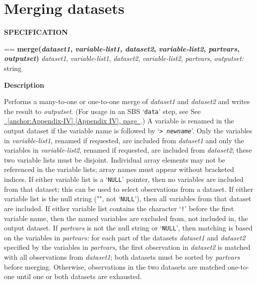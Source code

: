 \documentclass{book}
\makeatletter
\newcommand\Texinfocommandstyletextvar[1]{{\normalfont{}\textsl{#1}}}%
\newenvironment{Texinfopreformatted}{%
  \par\GNUTobeylines\obeyspaces\frenchspacing\parskip=\z@\parindent=\z@}{}
{\catcode`\^^M=13 \gdef\GNUTobeylines{\catcode`\^^M=13 \def^^M{\null\par}}}
\newenvironment{Texinfoindented}{\begin{list}{}{}\item\relax}{\end{list}}
\renewcommand{\_}{\Texinfounderscore\discretionary{}{}{}}
\makeatother
\begin{document}
\section{{Merging datasets}}
\label{anchor:Merging-datasets}%

\noindent{}\textbf{SPECIFICATION}
\begin{Texinfoindented}
\begin{Texinfopreformatted}%
\textbf{merge(\Texinfocommandstyletextvar{dataset1}, \Texinfocommandstyletextvar{variable-list1}, \Texinfocommandstyletextvar{dataset2}, \Texinfocommandstyletextvar{variable-list2}, \Texinfocommandstyletextvar{partvars}, \Texinfocommandstyletextvar{outputset})}
\Texinfocommandstyletextvar{dataset1}, \Texinfocommandstyletextvar{variable-list1}, \Texinfocommandstyletextvar{dataset2}, \Texinfocommandstyletextvar{variable-list2}, \Texinfocommandstyletextvar{partvars}, \Texinfocommandstyletextvar{outputset:} string
\end{Texinfopreformatted}
\end{Texinfoindented}
%
%

\noindent{}\textbf{Description}

Performs a many-to-one or one-to-one merge of
\Texinfocommandstyletextvar{dataset1} and \Texinfocommandstyletextvar{dataset2} and writes the result to \Texinfocommandstyletextvar{outputset}.
(For usage in an SBS `\texttt{data}' step, see See \hyperref[anchor:Appendix-IV]{\chaptername~\ref*{anchor:Appendix-IV} [Appendix IV], page~\pageref*{anchor:Appendix-IV}}.)
A variable is renamed in the output dataset if the variable name is followed by
`\texttt{> \Texinfocommandstyletextvar{newname}}'.
Only the variables in \Texinfocommandstyletextvar{variable-list1}, renamed if requested,
are included from \Texinfocommandstyletextvar{dataset1}
and only the variables in \Texinfocommandstyletextvar{variable-list2}, renamed if requested,
are included from \Texinfocommandstyletextvar{dataset2};
these two variable lists must be disjoint.
Individual array elements may not be referenced in the variable lists; array
names must appear without bracketed indices.
If either variable list is a `\texttt{NULL}'
pointer, then no variables are included from
that dataset; this can be used to select observations
from a dataset.
If either variable list is the null string ("", not `\texttt{NULL}'),
then all variables from that dataset are included.
If either variable list contains the character `\texttt{!}' before the first
variable name, then the named variables are excluded from, not included in,
the output dataset.
If \Texinfocommandstyletextvar{partvars} is not the null string or `\texttt{NULL}', then
matching is based on the variables in \Texinfocommandstyletextvar{partvars:}
for each part of the datasets \Texinfocommandstyletextvar{dataset1} and \Texinfocommandstyletextvar{dataset2}
specified by the variables in \Texinfocommandstyletextvar{partvars},
the first observation in \Texinfocommandstyletextvar{dataset2}
is matched with all observations from \Texinfocommandstyletextvar{dataset1};
both datasets must be sorted by \Texinfocommandstyletextvar{partvars} before merging.
Otherwise, observations in the two datasets are matched one-to-one
until one or both datasets are exhausted.
\end{document}
